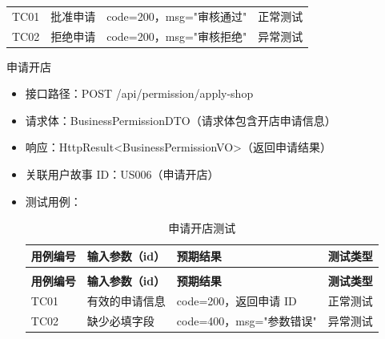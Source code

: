 \begin{levellist}
\begin{levellist}
\begin{itemize}
\begin{longtable}{>{\centering\arraybackslash}m{1.7cm} >{\centering\arraybackslash}m{3cm} >{\centering\arraybackslash}m{6.3cm} >{\centering\arraybackslash}m{2cm}}
                      \bottomrule
                      \endfoot

                      TC01          & 批准申请              & code=200，msg="审核通过" & 正常测试          \\
                      TC02          & 拒绝申请              & code=200，msg="审核拒绝" & 异常测试          \\
                  \end{longtable}
        \end{itemize}

        \item 申请开店
        \begin{itemize}
            \item 接口路径：POST /api/permission/apply-shop
            \item 请求体：BusinessPermissionDTO（请求体包含开店申请信息）
            \item 响应：HttpResult<BusinessPermissionVO>（返回申请结果）
            \item 关联用户故事 ID：US006（申请开店）
            \item 测试用例：
                  \begin{longtable}{>{\centering\arraybackslash}m{1.7cm} >{\centering\arraybackslash}m{3cm} >{\centering\arraybackslash}m{6.3cm} >{\centering\arraybackslash}m{2cm}}

                      \caption{申请开店测试} \label{tab:training}                                   \\

                      \toprule
                      \textbf{用例编号} & \textbf{输入参数（id）} & \textbf{预期结果}       & \textbf{测试类型} \\
                      \midrule
                      \endfirsthead

                      \multicolumn{4}{c}{{\tablename\ \thetable{} 续表}}                        \\
                      \toprule
                      \textbf{用例编号} & \textbf{输入参数（id）} & \textbf{预期结果}       & \textbf{测试类型} \\
                      \midrule
                      \endhead

                      \bottomrule
                      \endfoot


                      TC01          & 有效的申请信息           & code=200，返回申请 ID    & 正常测试          \\
                      TC02          & 缺少必填字段            & code=400，msg="参数错误" & 异常测试          \\
                  \end{longtable}
        \end{itemize}


\end{levellist}
\end{levellist}
